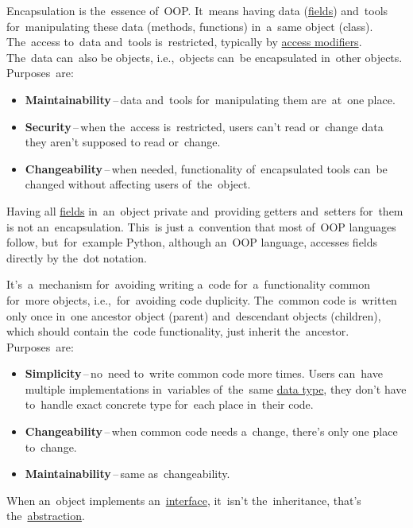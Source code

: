 \label{encapsulation}
Encapsulation is the~essence of~OOP. It~means having data (\hyperref[variablefieldproperty]{fields}) and~tools for~manipulating these data (methods, functions) in~a~same object (class). The~access to~data and~tools is~restricted, typically by \hyperref[javaaccessmodifiers]{access modifiers}. The~data can~also be objects, i.e.,~objects can~be encapsulated in~other objects. Purposes~are:
\begin{itemize}
    \item \textbf{Maintainability}\,--\,data and~tools for~manipulating them are~at~one place.
    \item \textbf{Security}\,--\,when the~access is~restricted, users can't read or~change data they aren't supposed to read or~change.
    \item \textbf{Changeability}\,--\,when needed, functionality of~encapsulated tools can~be changed without affecting users of~the~object.
\end{itemize}

\warning Having all \hyperref[variablefieldproperty]{fields} in~an~object private and~providing getters and~setters for~them is not an~encapsulation. This~is just a~convention that most of~OOP languages follow, but~for~example Python, although an~OOP language, accesses fields directly by the~dot notation.
\newpage

\label{inheritance}
It's~a~mechanism for~avoiding writing a~code for~a~functionality common for~more objects, i.e.,~for~avoiding code duplicity. The~common code is~written only once in~one ancestor object (parent) and~descendant objects (children), which should contain the~code functionality, just inherit the~ancestor. Purposes~are:
\begin{itemize}
    \item \textbf{Simplicity}\,--\,no~need to~write common code more times. Users can~have multiple implementations in~variables of~the~same \hyperref[datatypes]{data type}, they don't have to~handle exact concrete type for~each place in~their code.
    \item \textbf{Changeability}\,--\,when common code needs a~change, there's only one place to~change.
    \item \textbf{Maintainability}\,--\,same as~changeability.
\end{itemize}

\warning When an~object implements an~\hyperref[javainterface]{interface}, it~isn't the~inheritance, that's the~\hyperref[abstraction]{abstraction}.

